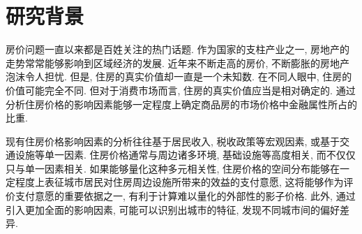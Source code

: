 \section{研究背景}
房价问题一直以来都是百姓关注的热门话题.
作为国家的支柱产业之一, 房地产的走势常常能够影响到区域经济的发展.
近年来不断走高的房价, 不断膨胀的房地产泡沫令人担忧.
但是, 住房的真实价值却一直是一个未知数.
在不同人眼中, 住房的价值可能完全不同.
但对于消费市场而言, 住房的真实价值应当是相对确定的.
通过分析住房价格的影响因素能够一定程度上确定商品房的市场价格中金融属性所占的比重.

现有住房价格影响因素的分析往往基于居民收入, 税收政策等宏观因素, 或基于交通设施等单一因素.
住房价格通常与周边诸多环境, 基础设施等高度相关, 而不仅仅只与单一因素相关.
如果能够量化这种多元相关性, 住房价格的空间分布能够在一定程度上表征城市居民对住房周边设施所带来的效益的支付意愿, 这将能够作为评价支付意愿的重要依据之一, 有利于计算难以量化的外部性的影子价格.
此外, 通过引入更加全面的影响因素, 可能可以识别出城市的特征, 发现不同城市间的偏好差异.
